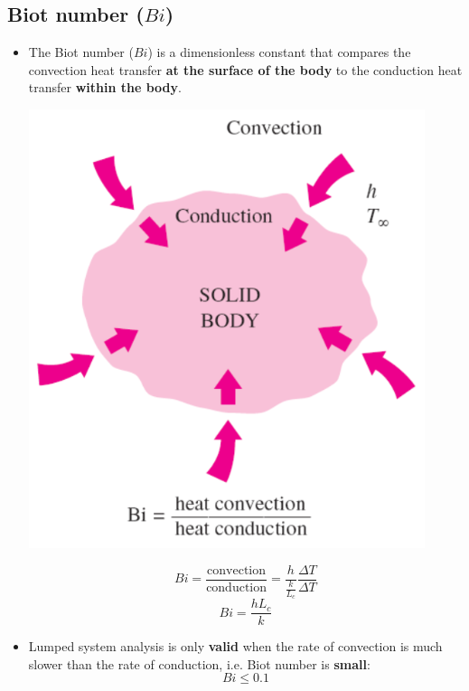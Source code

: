 \documentclass[11pt]{article}
\begin{document}
\subsection{Biot number (\(Bi\))}
\label{sec:orgb8178ee}
\begin{itemize}
\item The Biot number (\(Bi\)) is a dimensionless constant that compares the convection heat transfer \textbf{at the surface of the body} to the conduction heat transfer \textbf{within the body}.
\begin{center}
\includegraphics[width=.9\linewidth]{./images/biot-number-diagram.png}
\end{center}
\[Bi = \frac{\text{convection}}{\text{conduction}} = \frac{h}{\frac{k}{L_c}} \frac{\Delta T}{\Delta T}\]
\[Bi = \frac{hL_c}{k}\]
\item Lumped system analysis is only \textbf{valid} when the rate of convection is much slower than the rate of conduction, i.e. Biot number is \textbf{small}:
\[Bi \le 0.1\]
\end{itemize}
\end{document}
